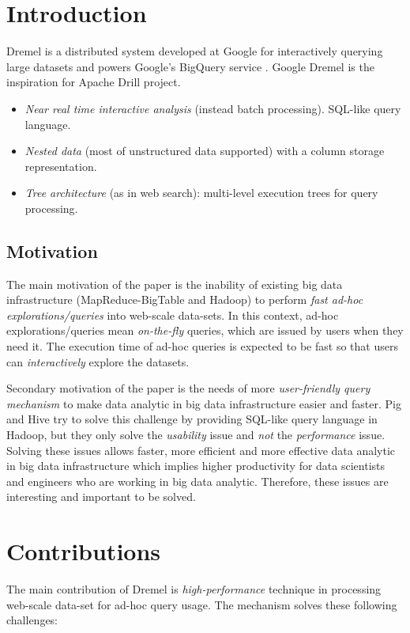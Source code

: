 \documentclass[twocolumn]{article}
\newcommand{\bi}{\begin{itemize}}
\newcommand{\ei}{\end{itemize}}
\newcommand{\ii}{\item}
\begin{document}
\section{Introduction}
Dremel is a distributed system developed at Google for interactively querying large datasets and powers Google's BigQuery service \cite{Melnik:2011}. Google Dremel is the inspiration for Apache Drill project.
\bi
\ii \textit{Near real time interactive analysis} (instead batch processing). SQL-like query language.
\ii \textit{Nested data} (most of unstructured data supported) with a column storage representation.
\ii \textit{Tree architecture} (as in web search): multi-level execution trees for query processing.
\ei

\subsection{Motivation}
The main motivation of the paper is the inability of existing big data infrastructure (MapReduce-BigTable and Hadoop) to perform \textit{fast ad-hoc explorations/queries} into web-scale data-sets. 
In this context, ad-hoc explorations/queries mean \textit{on-the-fly} queries, which are issued by users when they need it. The execution time of ad-hoc queries is expected to be fast so that users can \textit{interactively} explore the datasets.

Secondary motivation of the paper is the needs of more \textit{user-friendly query mechanism} to make data analytic in big data infrastructure easier and faster. 
Pig and Hive try to solve this challenge by providing SQL-like query language in Hadoop, 
but they only solve the \textit{usability} issue and \textit{not} the \textit{performance} issue.
Solving these issues allows faster, more efficient and more effective data analytic in big data infrastructure 
which implies higher productivity for data scientists and engineers who are working in big data analytic. 
Therefore, these issues are interesting and important to be solved.

\section{Contributions}
The main contribution of Dremel is\textit{ high-performance} technique in processing web-scale data-set for 
ad-hoc query usage. The mechanism solves these following challenges:
\end{document}
